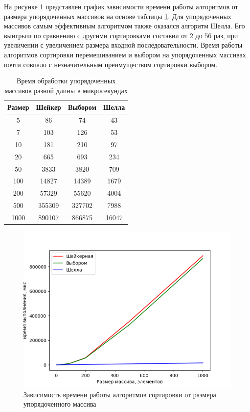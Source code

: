\documentclass[a4paper,oneside,14pt]{extreport}
\begin{document}
На рисунке \ref{fig:sort_arrays} представлен график зависимости времени работы алгоритмов от размера упорядоченных массивов на основе таблицы \ref{tab:sort_time}. Для упорядоченных массивов самым эффективным алгоритмом также оказался алгоритм Шелла. Его выигрыш по сравнению с другими сортировками составил от 2 до 56 раз, при увеличении с увеличением размера входной последовательности. Время работы алгоритмов сортировки перемешиванием и выбором на упорядоченных массивах почти совпало с незначительным преимуществом сортировки выбором.

\begin{table}[H]
	\begin{center}
		\captionsetup{justification=raggedleft, singlelinecheck=false}
		\caption{\label{tab:sort_time} Время обработки упорядоченных массивов разной длины в микросекундах}
		\begin{tabular}{|c c c c|} 
			\hline
			Размер&Шейкер&Выбором&Шелла\\ [0.5ex]
			\hline
			5 &  86 &  74 &  43\\ 
			\hline
			7 &  103 &  126 &  53\\ 
			\hline
			10 &  181 &  210 &  97\\ 
			\hline
			20 &  665 &  693 &  234\\ 
			\hline
			50 &  3833 &  3820 &  709\\ 
			\hline
			100 &  14827 &  14389 &  1679\\ 
			\hline
			200 &  57329 &  55620 &  4004\\ 
			\hline
			500 &  355309 &  327702 &  7988\\ 
			\hline
			1000 &  890107 &  866875 &  16047\\ 
			\hline
		\end{tabular}
	\end{center}
\end{table}

\begin{figure}[H]
	\centering
	\includegraphics[width=1\linewidth]{images/sorted_arrays}
	\caption{Зависимость времени работы алгоритмов сортировки от размера упорядоченного массива}
	\label{fig:sort_arrays}
\end{figure}
\end{document}
